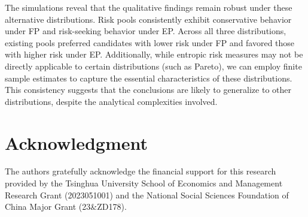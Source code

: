 \documentclass[fleqn,mnsc,nonblindrev]{informs4}
\newcommand{\mb}[1]{\mbox{\boldmath \ensuremath{#1}}}
\begin{document}
The simulations reveal that the qualitative findings remain robust under these alternative distributions. Risk pools consistently exhibit conservative behavior under FP and risk-seeking behavior under EP. Across all three distributions, existing pools preferred candidates with lower risk under FP and favored those with higher risk under EP. Additionally, while entropic risk measures may not be directly applicable to certain distributions (such as Pareto), we can employ finite sample estimates to capture the essential characteristics of these distributions. This consistency suggests that the conclusions are likely to generalize to other distributions, despite the analytical complexities involved.

\section{Acknowledgment}

The authors gratefully acknowledge the financial support for this research provided by the Tsinghua University School of Economics and Management Research Grant (2023051001) and the National Social Sciences Foundation of China Major Grant (23\&ZD178).







\end{document}
